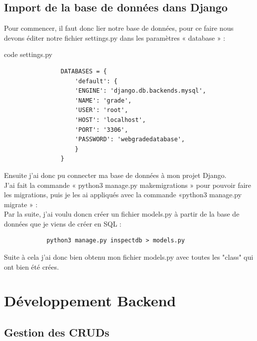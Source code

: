 \documentclass[12pt, a4paper]{article}
\begin{document}
        \subsection{Import de la base de données dans Django}
        Pour commencer, il faut donc lier notre base de données, pour ce faire nous devons éditer notre fichier settings.py dans les paramètres « database » :
        \begin{listing}[H]
            \caption{code settings.py}
            \label{lst:settings}
            \begin{verbatim}
                DATABASES = {
                    'default': {
                    'ENGINE': 'django.db.backends.mysql',
                    'NAME': 'grade', 
                    'USER': 'root',
                    'HOST': 'localhost',
                    'PORT': '3306',
                    'PASSWORD': 'webgradedatabase',
                    }
                }
            \end{verbatim}
        \end{listing}
        Ensuite j’ai donc pu connecter ma base de données à mon projet Django. 
        \\J’ai fait la commande « python3 manage.py makemigrations » pour pouvoir faire les migrations, puis je les ai appliqués avec la commande «python3 manage.py migrate » :
        \\[1cm]Par la suite, j'ai voulu doncn créer un fichier models.py à partir de la base de données que je viens de créer en SQL :
        \begin{verbatim}
            python3 manage.py inspectdb > models.py
        \end{verbatim}
        Suite à cela j'ai donc bien obtenu mon fichier models.py avec toutes les "class" qui ont bien été crées.
    \newpage
    \section{Développement Backend}
        \subsection{Gestion des CRUDs}
\end{document}
